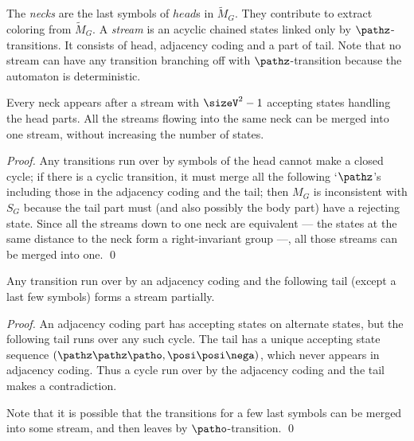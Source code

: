 The {\em necks} are the last symbols of $head$s in $\tilde{M}_G$.
They contribute to extract coloring from $\tilde{M}_G$.
% 
A {\em stream} is an acyclic chained states linked only by $\pathz$-transitions.
It consists of head, adjacency coding and a part of tail.
Note that no stream can have any transition branching off with $\pathz$-transition because the automaton is deterministic.


\begin{property}\label{pro:head}
	Every neck appears after a stream with $\sizeV^2 -1$ accepting states handling the head parts. 
	All the streams flowing into the same neck can be merged into one stream, without increasing the number of states. 
\end{property}
\begin{proof}
	Any transitions run over by symbols of the head cannot make a closed cycle; 
	if there is a cyclic transition, it must merge all the following `$\pathz$'s including those in the adjacency coding and the tail; 
	then $M_G$ is inconsistent with $S_G$ because the tail part must (and also possibly the body part) have a rejecting state.
	Since all the streams down to one neck are equivalent --- the states at the same distance to the neck form a right-invariant group ---, all those streams can be merged into one. \qed
\end{proof}

\begin{property}\label{pro:acyclic}
	Any transition run over by an adjacency coding and the following tail (except a last few symbols) forms a stream partially.
\end{property}
\begin{proof}
	An adjacency coding part has accepting states on alternate states, but the following tail runs over any such cycle. 
	The tail has a unique accepting state sequence $(\pathz\pathz\patho, \posi\posi\nega)$, which never appears in adjacency coding.
	Thus a cycle run over by the adjacency coding and the tail makes a contradiction.

	Note that it is possible that the transitions for a few last symbols can be merged into some stream, and then leaves by $\patho$-transition. \qed
\end{proof}

